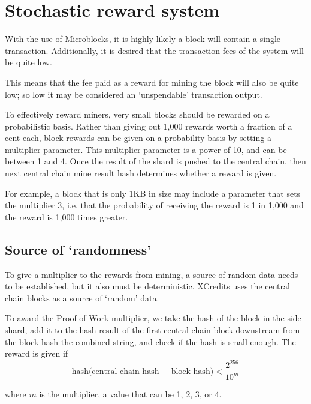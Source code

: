 \documentclass[a4paper,12pt]{article}
\begin{document}
\section{Stochastic reward system}
With the use of Microblocks, it is highly likely a block will contain a single transaction. Additionally, it is desired that the transaction fees of the system will be quite low.

This means that the fee paid as a reward for mining the block will also be quite low; so low it may be considered an `unspendable' transaction output.

To effectively reward miners, very small blocks should be rewarded on a probabilistic basis. Rather than giving out 1,000 rewards worth a fraction of a cent each, block rewards can be given on a probability basis by setting a multiplier parameter. This multiplier parameter is a power of 10, and can be between 1 and 4. Once the result of the shard is pushed to the central chain, then next central chain mine result hash determines whether a reward is given. 

For example, a block that is only 1KB in size may include a parameter that sets the multiplier 3, i.e. that the probability of receiving the reward is 1 in 1,000 and the reward is 1,000 times greater. 

\subsection{Source of `randomness'}
To give a multiplier to the rewards from mining, a source of random data needs to be established, but it also must be deterministic. XCredits uses the central chain blocks as a source of `random' data. 

To award the Proof-of-Work multiplier, we take the hash of the block in the side shard, add it to the hash result of the first central chain block downstream from the block hash the combined string, and check if the hash is small enough. The reward is given if
\[\text{hash(central chain hash + block hash)} < \frac{2^{256}}{10^m} \]

where $m$ is the multiplier, a value that can be 1, 2, 3, or 4.
\end{document}
